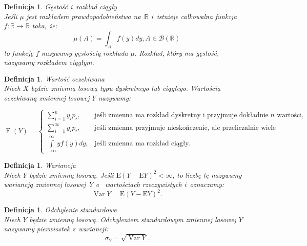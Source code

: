 \documentclass[12pt,a4paper]{report}
\newtheorem{definition}[theorem]{Definicja}
\newcommand{\Ex}{\operatorname{E}}
\newcommand{\Variance}{\operatorname{Var}}
\begin{document}
\begin{definition}{Gęstość i~rozkład ciągły \cite[Rozdział 5.1]{jakubowski2004}}\\
Jeśli $\mu$ jest rozkładem prawdopodobieństwa na~$\mathbb{R}$ i~istnieje całkowalna funkcja $f: \mathbb{R} \rightarrow \mathbb{R}$ taka, że:
$$\mu(A)=\int_A f(y)dy,   A\in \mathcal{B}(\mathbb{R})  $$  %
to funkcję $f$ nazywamy gęstością rozkładu $\mu$. Rozkład, który ma gęstość, nazywamy rozkładem ciągłym. 
\end{definition}



\begin{definition}{Wartość oczekiwana \cite[Rozdział 2.6]{krysicki1999}}\\
Niech $X$ będzie zmienną losową typu dyskretnego lub ciągłego. Wartością oczekiwaną zmiennej losowej $Y$ nazywamy:

$$
\Ex (Y)=\left\{ \begin{array}{ll}
\sum\limits_{i=1}^{n} {y_ip_i}, & \textrm{jeśli zmienna ma rozkład dyskretny i~przyjmuje dokładnie $n$ wartości, }\\ 
\sum\limits_{i=1}^{\infty} {y_ip_i}, & \textrm{jeśli zmienna przyjmuje nieskończenie, ale przeliczalnie wiele wartości,}\\
\int\limits_{-\infty}^{\infty} {yf(y)dy}, & \textrm{jeśli zmienna ma rozkład ciągły.}
\end{array} \right.
$$

\end{definition}


\begin{definition}{Wariancja \cite[Rozdział 5.6]{jakubowski2004}}\\
Niech $Y$ będzie zmienną losową. Jeśli $\mathrm{E}(Y-\mathrm{E}Y)^2 < \infty$, to liczbę tę nazywamy wariancją zmiennej losowej Y o~ wartościach rzeczywistych i~oznaczamy: 
$$\Variance Y= \mathrm{E}(Y-\mathrm{E}Y)^2.$$
\end{definition}


\begin{definition}{Odchylenie standardowe \cite[Rozdział 5.6]{jakubowski2004}}\\
Niech $Y$ będzie zmienną losową. Odchyleniem standardowym zmiennej losowej $Y$ nazywamy pierwiastek z~wariancji:
$$\sigma_Y=\sqrt{\Variance Y}.$$

\end{definition}
\end{document}
